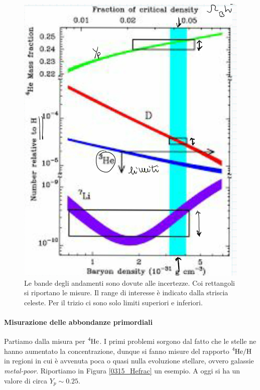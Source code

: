 \begin{figure}[h]
    \centering
    \includegraphics[scale=0.2]{Immagini/0315_massfraction2.png}
    \caption{Le bande degli andamenti sono dovute alle incertezze. Coi rettangoli si riportano le misure. Il range di interesse è indicato dalla striscia celeste. Per il trizio ci sono solo limiti superiori e inferiori.}
    \label{0315_mfrac2}
\end{figure}

\paragraph{Misurazione delle abbondanze primordiali} Partiamo dalla misura per $\ce{^4He}$. I primi problemi sorgono dal fatto che le stelle ne hanno aumentato la concentrazione, dunque si fanno misure del rapporto $\ce{^4He}/\ce{H}$ in regioni in cui è avvenuta poca o quasi nulla evoluzione stellare, ovvero galassie \textit{metal-poor}. Riportiamo in Figura \ref{0315_Hefrac} un esempio. A oggi si ha un valore di circa $Y_p \sim 0.25$.

